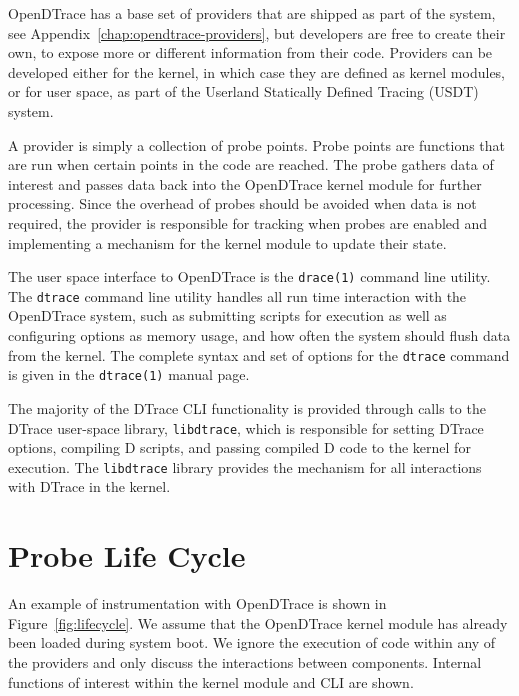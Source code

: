 OpenDTrace has a base set of providers that are shipped as part of the
system, see Appendix~\ref{chap:opendtrace-providers}, but developers are free to
create their own, to expose more or different information from their
code. Providers can be developed either for the kernel, in which case
they are defined as kernel modules, or for user space, as part of the
Userland Statically Defined Tracing (USDT) system.

A provider is simply a collection of probe points. Probe points are
functions that are run when certain points in the code are
reached. The probe gathers data of interest and passes data back into
the OpenDTrace kernel module for further processing. Since the
overhead of probes should be avoided when data is not required, the
provider is responsible for tracking when probes are enabled and
implementing a mechanism for the kernel module to update their state.

The user space interface to OpenDTrace is the \texttt{drace(1)}
command line utility. The \texttt{dtrace} command line utility handles
all run time interaction with the OpenDTrace system, such as
submitting scripts for execution as well as configuring options as
memory usage, and how often the system should flush data from the
kernel.  The complete syntax and set of options for the
\texttt{dtrace} command is given in the \texttt{dtrace(1)} manual
page.

The majority of the DTrace CLI functionality is provided through calls
to the DTrace user-space library, \texttt{libdtrace}, which is
responsible for setting DTrace options, compiling D scripts, and
passing compiled D code to the kernel for execution. The
\texttt{libdtrace} library provides the mechanism for all interactions
with DTrace in the kernel.

\section{Probe Life Cycle}
\label{sec:lifecycle}

An example of instrumentation with OpenDTrace is shown in
Figure~\ref{fig:lifecycle}. We assume that the OpenDTrace kernel
module has already been loaded during system boot. We ignore the
execution of code within any of the providers and only discuss the
interactions between components. Internal functions of interest within
the kernel module and CLI are shown.


